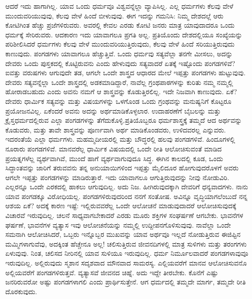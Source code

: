 
ಆದರೆ ಇದು ಹಾಗಾಗಿಲ್ಲ. ಯಾವ ಒಂದು ಧರ್ಮವೂ ವಿಶ್ವವನ್ನೆಲ್ಲಾ ವ್ಯಾಪಿಸಿಲ್ಲ. ಎಲ್ಲ ಧರ್ಮಗಳು ಕೆಲವು ವೇಳೆ ಮುಂದುವರಿಯುವುವು, ಕೆಲವು ವೇಳೆ ಹಿಂದೆ ಬೀಳುವುವು. ಈಗ ಇದನ್ನು ಗಮನಿಸಿ: ನಿಮ್ಮ ದೇಶದಲ್ಲೆ ಆರು ಕೋಟಿಗಿಂತ ಹೆಚ್ಚು ಪ್ರಜೆಗಳಿರುವರು. ಅವರಲ್ಲಿ ಕೇವಲ ಎರಡು ಕೋಟಿ ಜನರು ಮಾತ್ರ ಯಾವುದಾದರೂ ಒಂದು ಧರ್ಮಕ್ಕೆ ಸೇರಿರುವರು. ಆದಕಾರಣ ಇದು ಯಾವಾಗಲೂ ಪ್ರಗತಿ ಅಲ್ಲ. ಪ್ರತಿಯೊಂದು ದೇಶದಲ್ಲಿಯೂ ಸಂಖ್ಯೆಯನ್ನು ಪರಿಶೀಲಿಸಿದರೆ ಧರ್ಮಗಳು ಕೆಲವು ವೇಳೆ ಮುಂದುವರಿಯುತ್ತಿರುವುದು, ಕೆಲವು ವೇಳೆ ಹಿಂದೆ ಸರಿಯುತ್ತಿರುವುದು ಕಾಣುವುದು. ಪಂಗಡಗಳು ಯಾವಾಗಲೂ ಹೆಚ್ಚುತ್ತಿವೆ. ಒಂದು ಧರ್ಮವು ಸತ್ಯವೆಲ್ಲಾ ತನಗೇ ಮೀಸಲು, ಅದನ್ನು ದೇವರು ಒಂದು ಪುಸ್ತಕದಲ್ಲಿ ಕೊಟ್ಟಿರುವನು ಎಂದು ಹೇಳುವುದು ಸತ್ಯವಾದರೆ ಏತಕ್ಕೆ ಇಷ್ಟೊಂದು ಪಂಗಡಗಳಿವೆ? ಐವತ್ತು ವರುಷಗಳು ಆಗುವುದೇ ತಡ, ಆಗಲೇ ಒಂದೇ ಶಾಸ್ತ್ರದ ಆಧಾರದ ಮೇಲೆ ಇಪ್ಪತ್ತು ಪಂಗಡಗಳು ಹುಟ್ಟುವುವು. ದೇವರು ಸತ್ಯವನ್ನೆಲ್ಲಾ ಒಂದೇ ಶಾಸ್ತ್ರದಲ್ಲಿ ಅಡಕಮಾಡಿದ್ದಾರೆ, ನಾವೆಲ್ಲ ಗ್ರಂಥಪಾಠಗಳನ್ನು ಕುರಿತು ನಮ್ಮ ನಮ್ಮಲ್ಲಿ ಹೋರಾಡಬಹುದು ಎಂದು ಅವನು ನಮಗೆ ಆ ಶಾಸ್ತ್ರವನ್ನು ಕೊಡುತ್ತಿರಲಿಲ್ಲ. ಇದೇ ನಿಜವಾಗಿ ಕಾಣುವುದು. ಏಕೆ? ದೇವರು ಧಾರ್ಮಿಕ ಸತ್ಯವನ್ನು ಮತ್ತು ವಿಷಯಗಳನ್ನು ಒಳಗೊಂಡ ಒಂದು ಗ್ರಂಥವನ್ನು ಮನುಷ್ಯನಿಗೆ ಕೊಟ್ಟರೂ ಪ್ರಯೋಜನವಿಲ್ಲ. ಏಕೆಂದರೆ ಅವನು ಅದನ್ನು ಅರ್ಥಮಾಡಿಕೊಳ್ಳಲಾರ. ಉದಾಹರಣೆಗೆ ಬೈಬಲನ್ನು ಮತ್ತು ಕ್ರೈಸ್ತಧರ್ಮದಲ್ಲಿರುವ ಎಲ್ಲಾ ಪಂಗಡಗಳನ್ನು ತೆಗೆದುಕೊಳ್ಳಿ.ಪ್ರತಿಯೊಬ್ಬರೂ ಧರ್ಮಶಾಸ್ತ್ರಕ್ಕೆ ತಮ್ಮದೆ ಆದ ಅರ್ಥವನ್ನು ಕೊಡುವರು, ಮತ್ತು ತಾವೇ ಶಾಸ್ತ್ರವನ್ನು ಪೂರ್ಣವಾಗಿ ಅರ್ಥ ಮಾಡಿಕೊಂಡವರು, ಉಳಿದವರಲ್ಲ ಎನ್ನುವರು. ಇದರಂತೆಯೆ ಎಲ್ಲಾ ಧರ್ಮಗಳು. ಮಹಮ್ಮದೀಯರಲ್ಲಿ ಮತ್ತು ಬೌದ್ಧರಲ್ಲಿ ಹಲವು ಪಂಗಡಗಳಿವೆ. ಹಿಂದೂಗಳಲ್ಲಿ ನೂರಾರು ಪಂಗಡಗಳಿವೆ. ಮಾನವರೆಲ್ಲ ಧಾರ್ಮಿಕ ವಿಷಯದಲ್ಲಿ ಒಂದೇ ರೀತಿ ಆಲೋಚಿಸುವಂತೆ ಮಾಡಿದ ಪ್ರಯತ್ನಗಳೆಲ್ಲ ವ್ಯರ್ಥವಾಗಿವೆ, ಮುಂದೆ ಹಾಗೆ ವ್ಯರ್ಥವಾಗುವುದೂ ಸಿದ್ಧ. ಈಗಿನ ಕಾಲದಲ್ಲಿ ಕೂಡ, ಒಂದು ಸಿದ್ಧಾಂತವನ್ನು ಜಾರಿಗೆ ತರುವವನು ತನ್ನ ಅನುಯಾಯಿಗಳಿಂದ ಇಪ್ಪತ್ತು ಮೈಲಿದೂರ ಹೋಗುವುದರೊಳಗೆ ಅವರು ಆಗಲೇ ಇಪ್ಪತ್ತು ಪಂಗಡಗಳನ್ನು ಮಾಡಿರುತ್ತಾರೆ. ಇದು ಯಾವಾಗಲೂ ಆಗುತ್ತಿರುವುದನ್ನು ನೀವು ನೋಡುವಿರಿ. ಎಲ್ಲರನ್ನೂ ಒಂದೇ ಎರಕದಲ್ಲಿ ಹಾಕಲು ಆಗುವುದಿಲ್ಲ. ಅದು ನಿಜ. ಹೀಗಿರುವುದಕ್ಕಾಗಿ ದೇವರಿಗೆ ಧನ್ಯವಾದಗಳು. ನಾನು ಯಾವ ಪಂಗಡಕ್ಕೂ ವಿರೋಧಿಯಲ್ಲ. ಪಂಗಡಗಳಿರುವುದರಿಂದ ನನಗೆ ಸಂತೋಷ. ಅವಿನ್ನೂ ವೃದ್ಧಿಯಾಗಲೆಂಬುದೆ ನನ್ನ ಆಶಯ ಏಕೆ? ಅದಕ್ಕೆ ಕಾರಣ ಇಷ್ಟೆ: ಇಲ್ಲಿರುವವರೆಲ್ಲ ಒಂದೇ ಆಲೋಚನೆ ಮಾಡುವುದಾದರೆ ಆಲೋಚಿಸುವುದಕ್ಕೆ ವಿಚಾರವೆ ಇರುವುದಿಲ್ಲ. ಚಲನೆ ಸಾಧ್ಯವಾಗಬೇಕಾದರೆ ಎರಡು ಮೂರು ಶಕ್ತಿಗಳ ಸಂಘರ್ಷಣೆ ಆಗಬೇಕು. ಭಾವನೆಗಳ ಘರ್ಷಣೆ, ಭಾವನೆಗಳ ವ್ಯತ್ಯಾಸ ಇವು ಆಲೋಚನೆಯನ್ನು ನಮ್ಮಲ್ಲಿ ಉದ್ದೀಪನಗೊಳಿಸುವುವು. ನಾವೆಲ್ಲಾ ಒಂದೇ ಸಮನಾಗಿ ಆಲೋಚಿಸಿದರೆ, ಒಬ್ಬರು ಇನ್ನೊಬ್ಬರ ಮುಖವನ್ನು ಯಾವ ಅರ್ಥವೂ ಇಲ್ಲದೆ ನೋಡುತ್ತಿರುವ ಈಜಿಪ್ಟಿನ ಮಮ್ಮಿಗಳಾಗುವೆವು, ಅದಕ್ಕಿಂತ ಹೆಚ್ಚೇನೂ ಅಲ್ಲ! ಚಲಿಸುತ್ತಿರುವ ಜೀವನದಿಗಳಲ್ಲಿ ಮಾತ್ರ ಸುಳಿಗಳು ಮತ್ತು ತರಂಗಗಳು ಏಳುವುವು. ನಿಂತ, ಚಲಿಸದ ನೀರಿನಲ್ಲಿ ಯಾವ ಸುಳಿಯೂ ಇರುವುದಿಲ್ಲ. ಧರ್ಮ ನಿರ್ಮೂಲವಾದರೆ ಪಂಗಡಗಳಾವುವೂ ಇರುವುದಿಲ್ಲ. ಅಲ್ಲಿರುವುದು ಸ್ಮಶಾನ ಸದೃಶವಾದ ಮೌನವಾದ ಸಾಮರಸ್ಯ. ಎಲ್ಲಿಯವರೆಗೆ ಮಾನವ ಆಲೋಚಿಸುವನೊ ಅಲ್ಲಿಯವರೆಗೆ ಪಂಗಡಗಳಿರುತ್ತವೆ. ವ್ಯತ್ಯಾಸವೆ ಜೀವನದ ಚಿಹ್ನೆ. ಅದು ಇದ್ದೇ ತೀರಬೇಕು. ಕೊನೆಗೆ ಎಷ್ಟು ಜನರಿರುವರೋ ಅಷ್ಟು ಪಂಗಡಗಳಾಗಲಿ ಎಂದು ಪ್ರಾರ್ಥಿಸುತ್ತೇನೆ. ಆಗ ಧರ್ಮದಲ್ಲಿ ತಮ್ಮದೇ ಮಾರ್ಗ, ತಮ್ಮದೇ ರೀತಿ ದೊರಕುವುದು.

